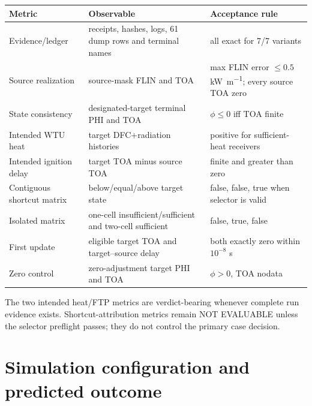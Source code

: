 \begin{center}

\begin{longtable}{@{}P{0.25\textwidth}P{0.35\textwidth}P{0.30\textwidth}@{}}\toprule
Metric & Observable & Acceptance rule\\\midrule
Evidence/ledger & receipts, hashes, logs, 61 dump rows and terminal names & all exact for 7/7 variants\\
Source realization & source-mask FLIN and TOA & max FLIN error \(\le0.5\) \si{\kilo\watt\per\metre}; every source TOA zero\\
State consistency & designated-target terminal PHI and TOA & \(\phi\le0\) iff TOA finite\\
Intended WTU heat & target DFC+radiation histories & positive for sufficient-heat receivers\\
Intended ignition delay & target TOA minus source TOA & finite and greater than zero\\
Contiguous shortcut matrix & below/equal/above target state & false, false, true when selector is valid\\
Isolated matrix & one-cell insufficient/sufficient and two-cell sufficient & false, true, false\\
First update & eligible target TOA and target--source delay & both exactly zero within \(10^{-8}\) s\\
Zero control & zero-adjustment target PHI and TOA & \(\phi>0\), TOA nodata\\
\bottomrule\end{longtable}
\end{center}

The two intended heat/FTP metrics are verdict-bearing whenever complete run
evidence exists. Shortcut-attribution metrics remain NOT EVALUABLE unless the
selector preflight passes; they do not control the primary case decision.

\section{Simulation configuration and predicted outcome}

